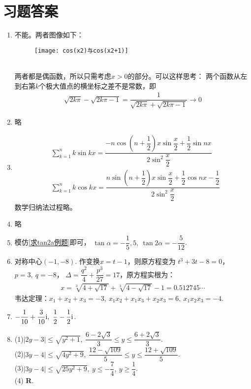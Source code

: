 \section{习题答案}
\begin{enumerate}[label={\textbf{\arabic*.}},leftmargin=
    \inteval{\myenumleftmargin}pt]

\item 不能。两者图像如下：
\begin{figure}[h]
    \centering
    \texttt{[image: cos(x2)与cos(x2+1)]}
\end{figure} \\
两者都是偶函数，所以只需考虑$ x>0 $的部分。可以这样思考：
两个函数从左到右第$ k $个极大值点的横坐标之差不是常数，即
\begin{gather*}
    \sqrt{2k\pi}-\sqrt{2k\pi-1}=\dfrac{1}{\sqrt{2k\pi}+\sqrt{2k\pi-1}}\to 0
\end{gather*}

\item 略

\item \begin{align*}
    &\sum_{k=1}^{n}k\sin kx=\dfrac{-n\cos(n+\dfrac{1}{2})x\sin\dfrac{x}{2}+
        \dfrac{1}{2}\sin nx}{2\sin^2 \dfrac{x}{2}} \\
    &\sum_{k=1}^{n}k\cos kx=\dfrac{n\sin(n+\dfrac{1}{2})x\sin\dfrac{x}{2}+
        \dfrac{1}{2}\cos nx - \dfrac{1}{2}}{2\sin^2 \dfrac{x}{2}} 
\end{align*}
数学归纳法过程略。

\item 略

\item 模仿\ref{求tan2a例题}即可，
$ \tan\alpha=-\dfrac{1}{5},5,\ \tan2\alpha=-\dfrac{5}{12} $.  

\item 对称中心$ (-1,-8) $. 作变换$ x=t-1 $，则原方程变为
$ t^3+3t-8=0 $，$ p=3,\ q=-8 $，
$ \Delta=\dfrac{q^2}{4}+\dfrac{p^3}{27}=17 $，原方程实根为：
\begin{align*}
    x =\sqrt[3]{4+\sqrt{17}}+\sqrt[3]{4-\sqrt{17}}-1=0.512745\cdots
\end{align*}
韦达定理：$ x_1+x_2+x_3=-3,\ x_1x_2+x_1x_3+x_2x_3=6,\ x_1x_2x_3=-4 $. 

\item $ -\dfrac{1}{10}+\dfrac{3}{10}\i,\ 
\dfrac{1}{2}-\dfrac{1}{2}\i $. 

\item
(1)$ |2y-3|\leq \sqrt{y^2+1},\ \dfrac{6-2\sqrt{3}}{3}\leq y\leq \dfrac{6+2\sqrt{3}}{3} $. \\
(2)$ |3y-4|\leq \sqrt{4y^2+9},\ \dfrac{12-\sqrt{109}}{5}\leq y\leq \dfrac{12+\sqrt{109}}{5} $. \\
(3)$ |3y-4|\leq \sqrt{25y^2+9},\ y\leq -\dfrac{7}{4},\ y\geq\dfrac{1}{4} $. \\
(4) \textbf{R}.


\end{enumerate}
